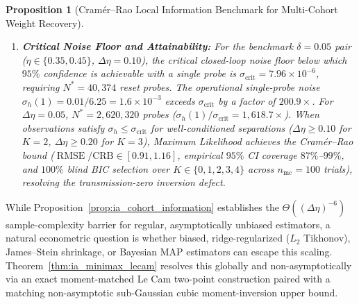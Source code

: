 \documentclass[12pt]{article}
\newtheorem{proposition}[theorem]{Proposition}
\theoremstyle{definition}
\theoremstyle{remark}
\begin{document}
\begin{proposition}[Cram\'er--Rao Local Information Benchmark for Multi-Cohort Weight Recovery]
\begin{enumerate}
\item \textbf{Critical Noise Floor and Attainability:} For the benchmark $\delta=0.05$ pair ($\eta \in \{0.35, 0.45\}$, $\Delta\eta = 0.10$), the critical closed-loop noise floor below which $95\%$ confidence is achievable with a single probe is $\sigma_{\mathrm{crit}} = 7.96 \times 10^{-6}$, requiring $N^* = 40{,}374$ reset probes. The operational single-probe noise $\sigma_h(1) = 0.01 / 6.25 = 1.6 \times 10^{-3}$ exceeds $\sigma_{\mathrm{crit}}$ by a factor of $200.9\times$. For $\Delta\eta = 0.05$, $N^* = 2{,}620{,}320$ probes ($\sigma_h(1)/\sigma_{\mathrm{crit}} = 1{,}618.7\times$). When observations satisfy $\sigma_h \le \sigma_{\mathrm{crit}}$ for well-conditioned separations ($\Delta\eta \ge 0.10$ for $K=2$, $\Delta\eta \ge 0.20$ for $K=3$), Maximum Likelihood achieves the Cram\'er--Rao bound ($\operatorname{RMSE}/\mathrm{CRB} \in [0.91, 1.16]$, empirical $95\%$ CI coverage $87\%$--$99\%$, and $100\%$ blind BIC selection over $K \in \{0,1,2,3,4\}$ across $n_{\mathrm{mc}} = 100$ trials), resolving the transmission-zero inversion defect.
\end{enumerate}
\end{proposition}



While Proposition~\ref{prop:ia_cohort_information} establishes the $\Theta((\Delta\eta)^{-6})$ sample-complexity barrier for regular, asymptotically unbiased estimators, a natural econometric question is whether biased, ridge-regularized ($L_2$ Tikhonov), James--Stein shrinkage, or Bayesian MAP estimators can escape this scaling. Theorem~\ref{thm:ia_minimax_lecam} resolves this globally and non-asymptotically via an exact moment-matched Le Cam two-point construction paired with a matching non-asymptotic sub-Gaussian cubic moment-inversion upper bound.
\end{document}

